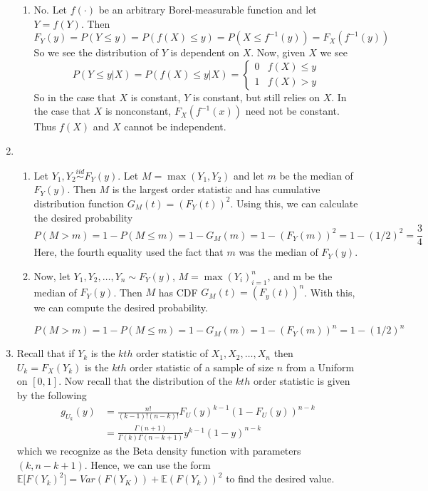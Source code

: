 \documentclass[12pt]{article}  %
\newcommand{\E}{{\mathbb{E}}}
\begin{document}
\begin{enumerate}
\begin{enumerate}
\item No. Let $f(\cdot)$ be an arbitrary Borel-measurable function and let $Y = f(Y)$. Then $$F_{Y}(y) = P(Y\leq y) = P(f(X)\leq y) = P(X\leq f^{-1}(y)) = F_{X}(f^{-1}(y))$$ So we see the distribution of $Y$ is dependent on $X$. Now, given $X$ we see $$P(Y\leq y|X) = P(f(X)\leq y|X) = \begin{cases} 0 & f(X)\leq y\\1 & f(X)>y\end{cases}$$ So in the case that $X$ is constant, $Y$ is constant, but still relies on $X$. In the case that $X$ is nonconstant, $F_X(f^{-1}(x))$ need not be constant. Thus $f(X)$ and $X$ cannot be independent. 

\end{enumerate}

\item 
\begin{enumerate}
\item Let $Y_1, Y_2\overset{iid}{\sim} F_{Y}(y)$. Let $M = \max(Y_1, Y_2)$ and let $m$ be the median of $F_{Y}(y)$. Then $M$ is the largest order statistic and has cumulative distribution function $G_{M}(t) = (F_Y(t))^2$. Using this, we can calculate the desired probability $$P(M>m) = 1 - P(M\leq m) = 1 - G_M(m) = 1 - (F_Y(m))^2 = 1 - (1/2)^2 = \frac{3}{4}$$ Here, the fourth equality used the fact that $m$ was the median of $F_Y(y)$.

\item Now, let $Y_1, Y_2, \ldots, Y_n\sim F_{Y}(y)$, $M = \max(Y_i)_{i=1}^{n}$, and m be the median of $F_Y(y)$. Then $M$ has CDF $G_{M}(t) = (F_y(t))^n$. With this, we can compute the desired probability.

$$P(M>m) = 1 - P(M\leq m) = 1 - G_{M}(m) = 1 - (F_Y(m))^n = 1 - (1/2)^n$$

\end{enumerate}

\item Recall that if $Y_k$ is the $kth$ order statistic of $X_1, X_2, \ldots, X_n$ then $U_k =F_X(Y_k)$ is the $kth$ order statistic of a sample of size $n$ from a Uniform on $[0,1]$. Now recall that the distribution of the $kth$ order statistic is given by the following 
\begin{align*}
g_{U_k}(y) &=\frac{n!}{(k-1)!(n-k)!}F_{U}(y)^{k-1}(1-F_{U}(y))^{n-k}\\	
&= \frac{\Gamma(n+1)}{\Gamma(k)\Gamma(n-k+1)}y^{k-1}(1-y)^{n-k}
\end{align*} which we recognize as the Beta density function with parameters $(k,n-k+1)$. Hence, we can use the form $\E\big[F(Y_k)^2\big] = Var(F(Y_K)) + \E(F(Y_k))^2$ to find the desired value. 


\end{enumerate}
\end{document}
